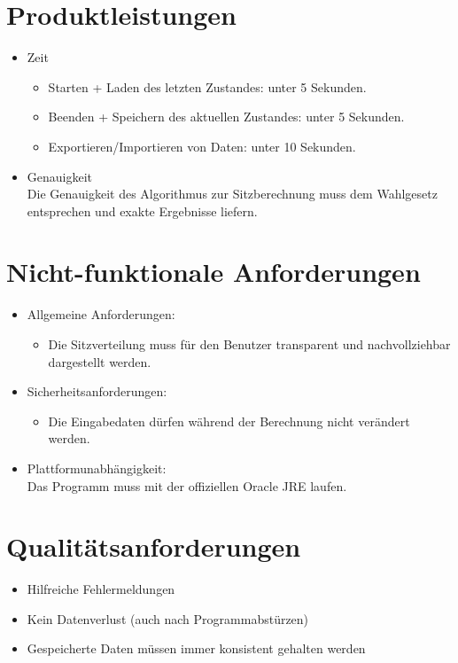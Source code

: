 \documentclass[10pt,a4paper]{article}
\begin{document}
\section{Produktleistungen}
\begin{itemize}
	\item Zeit
	\begin{itemize}
		\item Starten + Laden des letzten Zustandes: unter 5 Sekunden.
		\item Beenden + Speichern des aktuellen Zustandes: unter 5 Sekunden.
		\item Exportieren/Importieren von Daten: unter 10 Sekunden.
	\end{itemize}
	\item Genauigkeit \hfill \\
	Die Genauigkeit des Algorithmus zur Sitzberechnung muss dem Wahlgesetz entsprechen und exakte Ergebnisse liefern.
\end{itemize}


\section{Nicht-funktionale Anforderungen}
\begin{itemize}
	\item Allgemeine Anforderungen:
	\begin{itemize}
		\item Die Sitzverteilung muss für den Benutzer transparent und nachvollziehbar dargestellt werden.
	\end{itemize}
	\item Sicherheitsanforderungen:
	\begin{itemize}
		\item Die Eingabedaten dürfen während der Berechnung nicht verändert werden.
	\end{itemize}
	\item Plattformunabhängigkeit: \hfill \\
	Das Programm muss mit der offiziellen Oracle JRE laufen.
\end{itemize}


\section{Qualitätsanforderungen}
\begin{itemize}
	\item Hilfreiche Fehlermeldungen
	\item Kein Datenverlust (auch nach Programmabstürzen)
	\item Gespeicherte Daten müssen immer konsistent gehalten werden
\end{itemize}
\newpage
\end{document}
